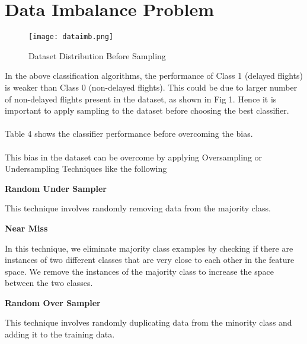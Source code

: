 \documentclass[12pt,letter-paper]{article}
\begin{document}
    
\section{Data Imbalance Problem}        

    \begin{figure}[H]%
        \begin{center}
          \texttt{[image: dataimb.png]}%
            \caption{Dataset Distribution Before Sampling}  
        \end{center}
    \end{figure}
    
    In the above classification algorithms, the performance of Class 1 (delayed flights) is weaker than Class 0 (non-delayed flights). This could be due to larger number of non-delayed flights present in the dataset, as shown in Fig 1. Hence it is important to apply sampling to the dataset before choosing the best classifier. 
    
    \paragraph{}
    Table 4 shows the classifier performance before overcoming the bias.
    
    \paragraph{}
        This bias in the dataset can be overcome by applying Oversampling or Undersampling Techniques like the following
        \item\textbf{Random Under Sampler}
            
            This technique involves randomly removing data from the majority class.
            
        \item\textbf{Near Miss}
            
            In this technique, we eliminate majority class examples by checking if there are instances of two different classes that are very close to each other in the feature space. We remove the instances of the majority class to increase the space between the two classes.  
            
        \item\textbf{Random Over Sampler}
            
            This technique involves randomly duplicating data from the minority class and adding it to the training data.
        
\end{document}
